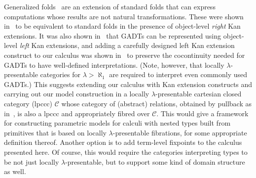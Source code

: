 \documentclass{lmcs}
\theoremstyle{plain}\newtheorem{satz}[thm]{Satz}
\newcommand{\cal}{\mathcal}
\newcommand{\set}{\mathsf{Set}}
\begin{document}
{%
Generalized folds~\cite{bp99} are an extension of standard folds that
can express computations whose results are not natural
transformations. These were shown in~\cite{jg10} to be equivalent to
standard folds in the presence of object-level {\em right} Kan
extensions.
It was also shown in~\cite{jg08} that GADTs can be represented using
object-level {\em left} Kan extensions, and
%
%
adding a carefully designed left Kan extension construct to our
calculus was shown in~\cite{jp19} to preserve the cocontinuity needed
for GADTs to have well-defined interpretations. (Note, however, that
locally $\lambda$-presentable categories for $\lambda > \aleph_1$ are
required to interpret even commonly used GADTs.) This suggests
extending our calculus with Kan extension constructs and
carrying out our model construction in a locally $\lambda$-presentable
cartesian closed category (lpccc) $\cal C$ whose category of
(abstract) relations, obtained by pullback as in~\cite{jac99},
is also a lpccc and appropriately fibred over $\cal C$.  This would
give a framework for constructing parametric models for calculi
with nested types built from primitives that is based on locally
$\lambda$-presentable fibrations, for some appropriate definition
thereof.  Another option is to add term-level fixpoints
to the calculus presented here. Of course, this would require the
categories interpreting types to be not just locally
$\lambda$-presentable, but to support some kind of domain structure as
well.
}





  
\end{document}
